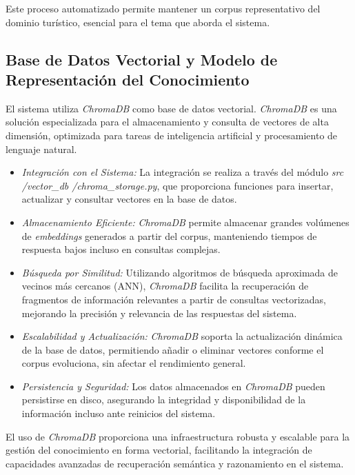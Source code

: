 \documentclass[10pt]{llncs}
\begin{document}
Este proceso automatizado permite mantener un corpus representativo del dominio turístico, esencial para el tema que aborda el sistema.

\vspace{\baselineskip}
\subsection{Base de Datos Vectorial y Modelo de Representación del Conocimiento}

El sistema utiliza \textit{ChromaDB} como base de datos vectorial. \textit{ChromaDB} es una solución 
especializada para el almacenamiento y consulta de vectores de alta dimensión, optimizada para tareas de inteligencia artificial y procesamiento de lenguaje natural.

\begin{itemize}
    \item \textit{Integración con el Sistema:} La integración se realiza a través del módulo \newline\textit{src /vector\_db /chroma\_storage.py}, que proporciona funciones para insertar, actualizar y consultar vectores en la base de datos.
    \item \textit{Almacenamiento Eficiente:} \textit{ChromaDB} permite almacenar grandes volúmenes de \textit{embeddings} generados a partir del corpus, manteniendo tiempos de respuesta bajos incluso en consultas complejas.
    \item \textit{Búsqueda por Similitud:} Utilizando algoritmos de búsqueda aproximada de vecinos más cercanos (ANN), \textit{ChromaDB} facilita la recuperación de fragmentos de información relevantes a partir de consultas vectorizadas, mejorando la precisión y relevancia de las respuestas del sistema.
    \item \textit{Escalabilidad y Actualización:} \textit{ChromaDB} soporta la actualización dinámica de la base de datos, permitiendo añadir o eliminar vectores conforme el corpus evoluciona, sin afectar el rendimiento general.
    \item \textit{Persistencia y Seguridad:} Los datos almacenados en \textit{ChromaDB} pueden persistirse en disco, asegurando la integridad y disponibilidad de la información incluso ante reinicios del sistema.
\end{itemize}

El uso de \textit{ChromaDB} proporciona una infraestructura robusta y escalable para la gestión del conocimiento en forma vectorial, facilitando la integración de capacidades avanzadas de recuperación semántica y razonamiento en el sistema.
\end{document}
